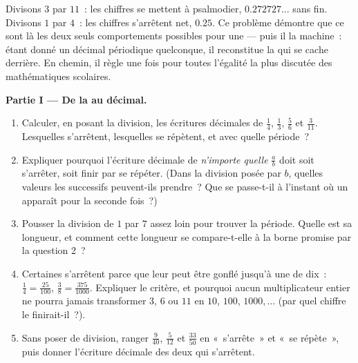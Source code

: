 \begin{problem}
\label{pb:g9:fractions:1}
Divisons $3$ par $11$~: les chiffres se mettent à psalmodier,
$0.272727\ldots$ sans fin. Divisons $1$ par $4$~: les chiffres
s'arrêtent net, $0.25$. Ce problème démontre que ce sont là les deux
seuls comportements possibles pour une  --- puis il 
la machine~: étant donné un décimal périodique quelconque, il
reconstitue la  qui se cache derrière. En chemin, il règle
une fois pour toutes l'égalité la plus discutée des mathématiques
scolaires.

\medskip
\noindent\textbf{Partie I --- De la  au décimal.}
\begin{enumerate}
  \item Calculer, en posant la division, les écritures décimales de
        $\frac14$, $\frac13$, $\frac56$ et $\frac{3}{11}$.
        Lesquelles s'arrêtent, lesquelles se répètent, et avec
        quelle période~?
  \item Expliquer pourquoi l'écriture décimale de \emph{n'importe
        quelle}  $\frac ab$ doit soit s'arrêter, soit finir
        par se répéter. (Dans la division posée par $b$, quelles
        valeurs les  successifs peuvent-ils prendre~? Que se
        passe-t-il à l'instant où un  apparaît pour la seconde
        fois~?)
  \item Pousser la division de $1$ par $7$ assez loin pour trouver
        la période. Quelle est sa longueur, et comment cette
        longueur se compare-t-elle à la borne promise par la
        question 2~?
  \item Certaines  s'arrêtent parce que leur 
        peut être gonflé jusqu'à une  de dix~:
        $\frac14 = \frac{25}{100}$,
        $\frac{3}{8} = \frac{375}{1000}$. Expliquer le critère, et
        pourquoi aucun multiplicateur entier ne pourra jamais
        transformer $3$, $6$ ou $11$ en $10$, $100$,
        $1000, \dots$ (par quel chiffre le 
        finirait-il~?).
  \item Sans poser de division, ranger $\frac{9}{40}$,
        $\frac{5}{12}$ et $\frac{33}{50}$ en «~s'arrête~» et
        «~se répète~», puis donner l'écriture décimale des deux qui
        s'arrêtent.
\end{enumerate}


\end{problem}
